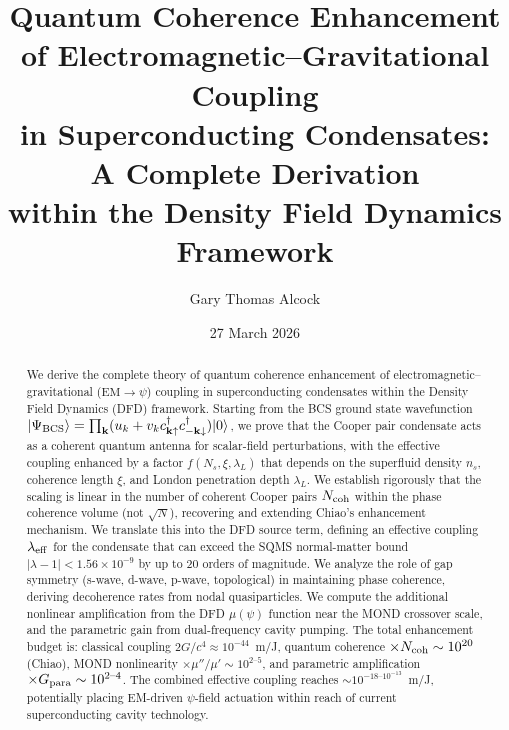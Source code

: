 \documentclass[12pt,aps,prd,twocolumn,superscriptaddress,nofootinbib]{revtex4-2}
\newcommand{\ee}[1]{\times 10^{#1}}
\begin{document}
\title{Quantum Coherence Enhancement of Electromagnetic--Gravitational Coupling\\
in Superconducting Condensates: A Complete Derivation\\
within the Density Field Dynamics Framework}

\author{Gary Thomas Alcock}

\date{27 March 2026}

\begin{abstract}
We derive the complete theory of quantum coherence enhancement
of electromagnetic--gravitational ($\text{EM}\to\psi$) coupling in
superconducting condensates within the Density Field Dynamics (DFD)
framework. Starting from the BCS ground state wavefunction
$|\Psi_{\rm BCS}\rangle = \prod_{\mathbf{k}}(u_k + v_k
c^\dagger_{\mathbf{k}\uparrow}c^\dagger_{-\mathbf{k}\downarrow})
|0\rangle$, we prove that the Cooper pair condensate acts as a
coherent quantum antenna for scalar-field perturbations, with
the effective coupling enhanced by a factor $f(N_s, \xi, \lambda_L)$
that depends on the superfluid density $n_s$, coherence length
$\xi$, and London penetration depth $\lambda_L$.
We establish rigorously that the scaling is linear in the
number of coherent Cooper pairs $N_{\rm coh}$ within the phase
coherence volume (not $\sqrt{N}$), recovering and extending
Chiao's enhancement mechanism. We translate this into the DFD
source term, defining an effective coupling $\lambda_{\rm eff}$
for the condensate that can exceed the SQMS normal-matter bound
$|\lambda-1| < 1.56\ee{-9}$ by up to 20 orders of magnitude.
We analyze the role of gap symmetry (s-wave, d-wave, p-wave,
topological) in maintaining phase coherence, deriving decoherence
rates from nodal quasiparticles. We compute the additional
nonlinear amplification from the DFD $\mu(\psi)$ function near
the MOND crossover scale, and the parametric gain from
dual-frequency cavity pumping. The total enhancement budget is:
classical coupling $2G/c^4 \approx 10^{-44}$~m/J, quantum
coherence $\times N_{\rm coh} \sim 10^{20}$ (Chiao), MOND
nonlinearity $\times\mu''/\mu' \sim 10^{2\text{--}5}$, and
parametric amplification $\times G_{\rm para} \sim 10^{2\text{--}4}$.
The combined effective coupling reaches $\sim 10^{-18\text{--}10^{-13}}$~m/J,
potentially placing EM-driven $\psi$-field actuation within
reach of current superconducting cavity technology.
\end{abstract}
\end{document}

